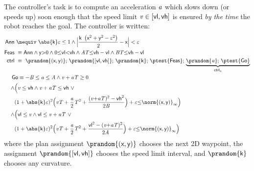\documentclass[12pt]{cmuthesis}
\theoremstyle{definition}
\theoremstyle{remark}
\newcommand{\xgivar}{\textsf{xi}}
\newcommand{\ygivar}{\textsf{yi}}
\newcommand{\xgvar}{\textsf{x}}
\newcommand{\ygvar}{\textsf{y}}
\newcommand{\kvar}{\textsf{k}}
\newcommand{\vlvar}{\textsf{vl}}
\newcommand{\vhvar}{\textsf{vh}}
\newcommand{\ctrl}{\textsf{ctrl}\xspace}
\newcommand{\ctrlliv}{\ctrl_{\text{a}}}
\newcommand{\lnorm}[1]{{{\norm{#1}}_{\infty}}}
\begin{document}
The controller's task is to compute an acceleration ${\it a}$ which slows down (or speeds up) soon enough that the speed limit $\vvar \in [\vlvar,\vhvar]$ is ensured \emph{by the time} the robot reaches the goal.
The controller is written:
\newcommand{\admiss}{\textsf{Go}} %
\newcommand{\planreq}{\textsf{Feas}} %
\newcommand{\veps}{\varepsilon}
\newcommand{\annul}{\textsf{Ann}\xspace}
\newcommand{\adjustSpeedDist}{\delta_\mathsf{Lim}\xspace}
\newcommand{\controllableGoalDist}{\mathsf{Lim}}
{\small\begin{align*}
\annul &~\mequiv~\abs{\kvar}\veps \leq 1 \land \Big|\frac{ \kvar~\left(\xgvar^2 +\ygvar^2 - \veps^2 \right)}{2} - \xgvar\Big| < \veps\\
\label{eq:planReq} \planreq &~\equiv \annul \land \ygvar{>}0 \land 0{\leq}\vlvar{<}\vhvar \land \Avar\Tvar{\leq}\vhvar-\vlvar \land \Bvar\Tvar{\leq}\vhvar-\vlvar\\
\ctrl &~\equiv~ \prandom{(\xgvar,\ygvar)};\,\prandom{[\vlvar,\vhvar]};\,\prandom{\kvar};\,\ptest{\planreq};\,\underbrace{\prandom{\avar};\,\ptest{\admiss}}_{\ctrlliv}\\
      ~&\hspace*{-5pt}\admiss \equiv-\Bvar\leq \avar \leq\Avar \land \vvar + \avar\Tvar \geq 0 \\
\land & \Bigl(\vvar \leq \vhvar \land \vvar+\avar\Tvar\leq \vhvar ~\lor \\
      & (1+\abs{\kvar}\veps)^2 \Bigl(\vvar\Tvar+\frac{\avar}{2}\Tvar^2 + \frac{(\vvar{+}\avar\Tvar)^2-\vhvar^2}{2\Bvar}\Bigr) + \veps{\leq}\lnorm{(\xgvar,\ygvar)} \Bigr)\\
\land & \Bigl(\vlvar \leq \vvar \land \vlvar \leq \vvar+\avar\Tvar ~\lor\\
      & (1+\abs{\kvar}\veps)^2 \Bigl(\vvar\Tvar+\frac{\avar}{2}\Tvar^2 + \frac{\vlvar^2 - (\vvar{+}\avar\Tvar)^2}{2\Avar}\Bigr) + \veps{\leq}\lnorm{(\xgvar,\ygvar)}\Bigr)\end{align*}}
\noindent where the plan assignment $\prandom{(\xgvar,\ygvar)}$ chooses the next 2D waypoint, the assignment $\prandom{[\vlvar,\vhvar]}$ chooses the speed limit interval, and $\prandom{\kvar}$ chooses any curvature.
\end{document}
